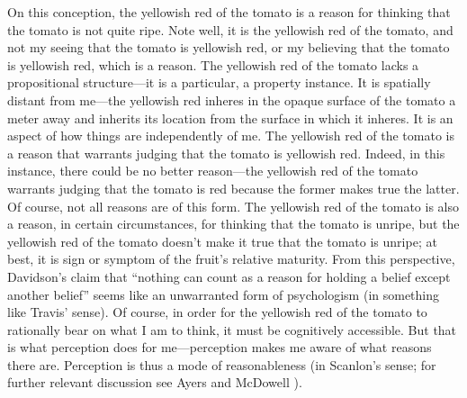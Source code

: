 \documentclass[12pt]{article}
\begin{document}
On this conception, the yellowish red of the tomato is a reason for thinking that the tomato is not quite ripe. Note well, it is the yellowish red of the tomato, and not my seeing that the tomato is yellowish red, or my believing that the tomato is yellowish red, which is a reason. The yellowish red of the tomato lacks a propositional structure---it is a particular, a property instance. It is spatially distant from me---the yellowish red inheres in the opaque surface of the tomato a meter away and inherits its location from the surface in which it inheres. It is an aspect of how things are independently of me. The yellowish red of the tomato is a reason that warrants judging that the tomato is yellowish red. Indeed, in this instance, there could be no better reason---the yellowish red of the tomato warrants judging that the tomato is red because the former makes true the latter. Of course, not all reasons are of this form. The yellowish red of the tomato is also a reason, in certain circumstances, for thinking that the tomato is unripe, but the yellowish red of the tomato doesn't make it true that the tomato is unripe; at best, it is sign or symptom of the fruit's relative maturity. From this perspective, Davidson's \citeyearpar[310]{Davidson:1986uq} claim that ``nothing can count as a reason for holding a belief except another belief'' seems like an unwarranted form of psychologism (in something like Travis' \citeyear{Travis:2006fk} sense). Of course, in order for the yellowish red of the tomato to rationally bear on what I am to think, it must be cognitively accessible. But that is what perception does for me---perception makes me aware of what reasons there are. Perception is thus a mode of reasonableness (in Scanlon's \citeyear[]{Scanlon:1998hb} sense; for further relevant discussion see Ayers \citeyear{Ayers:2004kx} and McDowell \citeyear{McDowell:2006vn}).
\end{document}
